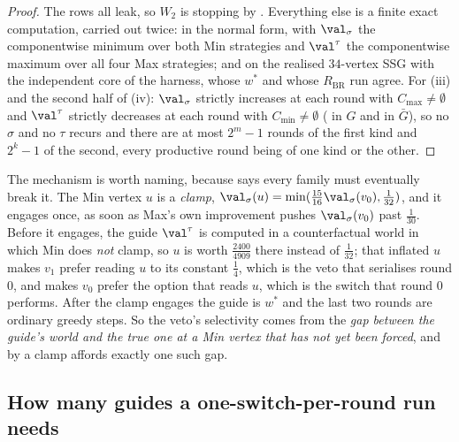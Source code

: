 \begin{proof}
The rows all leak, so $W_2$ is stopping by .  Everything
else is a finite exact computation, carried out twice: in the normal form,
with $\val_\sigma$ the componentwise minimum over both Min strategies and
$\val^{\tau}$ the componentwise maximum over all four Max strategies; and on
the realised $34$-vertex SSG with the independent core of the harness, whose
$w^{\ast}$ and whose $R_{\mathrm{BR}}$ run agree.  For (iii) and the second
half of (iv): $\val_\sigma$ strictly increases at each round with
$C_{\max}\ne\emptyset$ and $\val^{\tau}$ strictly decreases at each round with
$C_{\min}\ne\emptyset$ ( in $G$ and in $\bar G$), so no
$\sigma$ and no $\tau$ recurs and there are at most $2^{m}-1$ rounds of the
first kind and $2^{k}-1$ of the second, every productive round being of one
kind or the other.
\end{proof}

\begin{remark}\label{bsc:w2-rem}
The mechanism is worth naming, because  says every family must
eventually break it.  The Min vertex $u$ is a \emph{clamp},
$\val_\sigma(u)=\min(\tfrac{15}{16}\val_\sigma(v_0),\tfrac1{32})$, and it
engages once, as soon as Max's own improvement pushes $\val_\sigma(v_0)$ past
$\tfrac1{30}$.  Before it engages, the guide $\val^{\tau}$ is computed in a
counterfactual world in which Min does \emph{not} clamp, so $u$ is worth
$\tfrac{2400}{4909}$ there instead of $\tfrac1{32}$; that inflated $u$ makes
$v_1$ prefer reading $u$ to its constant $\tfrac14$, which is the veto that
serialises round $0$, and makes $v_0$ prefer the option that reads $u$, which
is the switch that round $0$ performs.  After the clamp engages the guide is
$w^{\ast}$ and the last two rounds are ordinary greedy steps.  So the veto's
selectivity comes from the \emph{gap between the guide's world and the true
one at a Min vertex that has not yet been forced}, and by  a
clamp affords exactly one such gap.
\end{remark}

\subsection{How many guides a one-switch-per-round run needs}

